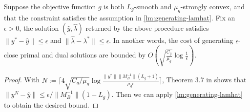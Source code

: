 \begin{proposition}
    Suppose the objective function $g$ is both $L_g$-smooth and $\mu_g$-strongly convex, and that the constraint satisfies the assumption in \cref{lm:generating-lamhat}. Fix an $\epsilon>0$, the solution  $(\hat y, \hat \lambda)$ returned by the above procedure satisfies $\|y^* - \hat y\|\leq \epsilon$ and $\|\hat \lambda - \lambda^*\|\leq \epsilon$. In another words, the cost of generating $\epsilon$-close primal and dual solutions are bounded by $O(\sqrt{\frac{C_g}{\mu_g}}\log{\frac{1}{\epsilon}}).$
\end{proposition}
\begin{proof}
With $N:=\lceil 4\sqrt{C_g/\mu_g}\log\frac{\|y^*\| \|M^{-1}_B\|(L_g+1)}{\mu_g\epsilon} \rceil$, Theorem 3.7 in \cite{lan2020first} shows that $\|y^N - \hat y\|\leq \epsilon/ \|M_{B}^{-1}\| (1+L_g)$. Then we can apply \cref{lm:generating-lamhat} to obtain the desired bound.
\end{proof}